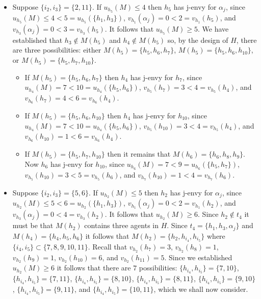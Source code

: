 \begin{itemize}
\begin{itemize}
    \item Suppose $\{ i_2, i_3 \} = \{ 2, 11 \}$. If $u_{h_5}(M) \leq 4$ then $h_5$ has j-envy for $\alpha_{j}$, since $u_{h_5}(M) \leq 4 < 5 = u_{h_5}(\{ h_1, h_3 \})$, $v_{h_1}(\alpha_{j}) = 0 < 2 = v_{h_1}(h_5)$, and $v_{h_3}(\alpha_{j}) = 0 < 3 = v_{h_3}(h_5)$. It follows that $u_{h_5}(M) \geq 5$. We have established that $h_3 \notin M(h_5)$ and $h_4 \notin M(h_5)$ so, by the design of $H$, there are three possibilities: either $M(h_5) = \{ h_5, h_6, h_7 \}$, $M(h_5) = \{ h_5, h_6, h_{10} \}$, or $M(h_5) = \{ h_5, h_7, h_{10} \}$.
    \begin{itemize}
        \item If $M(h_5) = \{ h_5, h_6, h_7 \}$ then $h_4$ has j-envy for $h_7$, since $u_{h_4}(M) = 7 < 10 = u_{h_4}(\{ h_5, h_6 \})$, $v_{h_5}(h_7) = 3 < 4 = v_{h_5}(h_4)$, and $v_{h_6}(h_7) = 4 < 6 = v_{h_6}(h_4)$.
        \item If $M(h_5) = \{ h_5, h_6, h_{10} \}$ then $h_4$ has j-envy for $h_{10}$, since $u_{h_4}(M) = 7 < 10 = u_{h_4}(\{ h_5, h_6 \})$, $v_{h_5}(h_{10}) = 3 < 4 = v_{h_5}(h_4)$, and $v_{h_6}(h_{10}) = 1 < 6 = v_{h_6}(h_4)$.
        \item If $M(h_5) = \{ h_5, h_7, h_{10} \}$ then it remains that $M(h_6) = \{ h_6, h_8, h_9 \}$. Now $h_6$ has j-envy for $h_{10}$, since $u_{h_6}(M) = 7 < 9 = u_{h_6}(\{ h_5, h_7 \})$, $v_{h_5}(h_{10}) = 3 < 5 = v_{h_5}(h_6)$, and $v_{h_7}(h_{10}) = 1 < 4 = v_{h_7}(h_6)$.
    \end{itemize}
    \item Suppose $\{ i_2, i_3 \} = \{ 5, 6 \}$. If $u_{h_2}(M) \leq 5$ then $h_2$ has j-envy for $\alpha_{j}$, since $u_{h_2}(M) \leq 5 < 6 = u_{h_2}(\{ h_1, h_3 \})$, $v_{h_1}(\alpha_{j}) = 0 < 2 = v_{h_1}(h_2)$, and $v_{h_3}(\alpha_{j}) = 0 < 4 = v_{h_3}(h_2)$. It follows that $u_{h_2}(M) \geq 6$. Since $h_2 \notin t_4$ it must be that $M(h_2)$ contains three agents in $H$. Since $t_4 = \{ h_1, h_3, \alpha_{j} \}$ and $M(h_4) = \{ h_4, h_5, h_6 \}$ it follows that $M(h_2) = \{ h_2, h_{i_4}, h_{i_5} \}$ where $\{ i_4, i_5 \} \subset \{ 7, 8, 9, 10, 11 \}$. Recall that $v_{h_2}(h_7)=3$, $v_{h_2}(h_8)=1$, $v_{h_2}(h_9)=1$, $v_{h_2}(h_{10})=6$, and $v_{h_2}(h_{11})=5$. Since we established $u_{h_2}(M) \geq 6$ it follows that there are $7$ possibilities: $\{ h_{i_4}, h_{i_5} \} = \{ 7, 10 \}$, $\{ h_{i_4}, h_{i_5} \} = \{ 7, 11 \}$, $\{ h_{i_4}, h_{i_5} \} = \{ 8, 10 \}$, $\{ h_{i_4}, h_{i_5} \} = \{ 8, 11 \}$, $\{ h_{i_4}, h_{i_5} \} = \{ 9, 10 \}$, $\{ h_{i_4}, h_{i_5} \} = \{ 9, 11 \}$, and $\{ h_{i_4}, h_{i_5} \} = \{ 10, 11 \}$, which we shall now consider.

\end{itemize}
\end{itemize}
